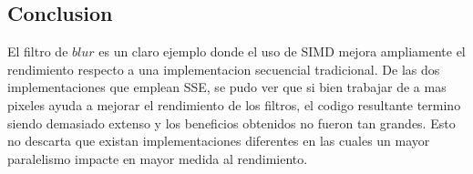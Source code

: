 





\subsection{Conclusion}
El filtro de $blur$ es un claro ejemplo donde el uso de SIMD mejora ampliamente el rendimiento respecto a una implementacion secuencial tradicional. De las dos implementaciones que emplean SSE, se pudo ver que si bien trabajar de a mas pixeles ayuda a mejorar el rendimiento de los filtros, el codigo resultante termino siendo demasiado extenso y los beneficios obtenidos no fueron tan grandes. Esto no descarta que existan implementaciones diferentes en las cuales un mayor paralelismo impacte en mayor medida al rendimiento.


